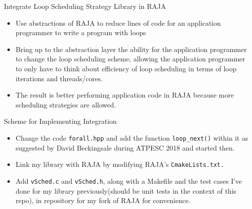 \documentclass{beamer}
\begin{document}
\begin{frame}{Integrate Loop Scheduling Strategy Library in RAJA}
\begin{itemize}
\item Use abstractions of RAJA to reduce lines of code for an application programmer to write a program with loops 
\item Bring up to the abstraction layer the ability for the application programmer to change the loop scheduling scheme, allowing the application programmer to only have to think about efficiency of loop scheduling in terms of loop iterations and threads/cores.  
\item The result is better performing application code in RAJA because more scheduling strategies are allowed. 
\end{itemize} 
\end{frame}

\begin{frame}{Scheme for Implementing Integration}
\begin{itemize}
\item Change the code {\tt forall.hpp} and add the function {\tt loop\_next()} within it as suggested by David Beckingsale during ATPESC 2018 and started then.
\item Link my library with RAJA by modifying RAJA's {\tt CmakeLists.txt.}
\item Add {\tt vSched.c} and {\tt vSched.h}, along with a Makefile and the test cases I've done for my library previously(should be unit tests in the context of this repo), in repository for my fork of RAJA for convenience.
\end{itemize}
\end{frame}
\end{document}
